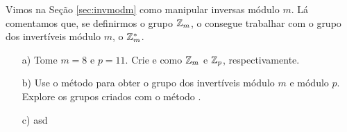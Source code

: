 \begin{exercise}
  Vimos na Seção \ref{sec:invmodm} como manipular inversas
  módulo $m$. Lá comentamos que, se definirmos o grupo
  $\mathbb{Z}_m$, o \sage consegue trabalhar com o grupo dos
  invertíveis módulo $m$, o $\mathbb{Z}_m^*$.
  \begin{itemize}
    \item[a)] Tome $m = 8$ e $p = 11$. Crie  e 
    como $\mathbb{Z}_m$ e $\mathbb{Z}_p$, respectivamente.
    \item[b)] Use o método  para obter o grupo
    dos invertíveis módulo $m$ e módulo $p$. Explore os
    grupos criados com o método .
    \item[c)] asd
  \end{itemize}
\end{exercise}